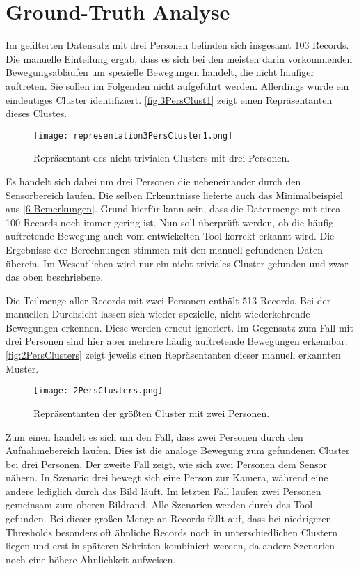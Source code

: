 \section{Ground-Truth Analyse}
\label{6-GroundTruth}
Im gefilterten Datensatz mit drei Personen befinden sich insgesamt 103 Records.
Die manuelle Einteilung ergab,
dass es sich bei den meisten darin vorkommenden Bewegungsabläufen
um spezielle Bewegungen handelt, die nicht häufiger auftreten.
Sie sollen im Folgenden nicht aufgeführt werden.
Allerdings wurde ein eindeutiges Cluster identifiziert.
\autoref{fig:3PersClust1} zeigt einen Repräsentanten dieses Clustes.
\begin{figure}[ht]
    \begin{center}
    \texttt{[image: representation3PersCluster1.png]}
    \end{center}
    \caption{Repräsentant des nicht trivialen Clusters mit drei Personen.}
    \label{fig:3PersClust1}
\end{figure}
Es handelt sich dabei um drei Personen die nebeneinander durch den Sensorbereich laufen.
Die selben Erkenntnisse lieferte auch das Minimalbeispiel aus \autoref{6-Bemerkungen}.
Grund hierfür kann sein, dass die Datenmenge mit circa 100 Records noch immer gering ist.
Nun soll überprüft werden, ob die häufig auftretende Bewegung auch
vom entwickelten Tool korrekt erkannt wird.
Die Ergebnisse der Berechnungen stimmen mit den manuell gefundenen Daten überein.
Im Wesentlichen wird nur ein nicht-triviales Cluster gefunden
und zwar das oben beschriebene.

Die Teilmenge aller Records mit zwei Personen enthält 513 Records.
Bei der manuellen Durchsicht lassen sich wieder spezielle,
nicht wiederkehrende Bewegungen erkennen.
Diese werden erneut ignoriert.
Im Gegensatz zum Fall mit drei Personen sind hier aber mehrere häufig auftretende Bewegungen erkennbar.
\autoref{fig:2PersClusters} zeigt jeweils einen Repräsentanten dieser manuell erkannten Muster.
\begin{figure}[ht]
    \begin{center}
    \texttt{[image: 2PersClusters.png]}
    \end{center}
    \caption{Repräsentanten der größten Cluster mit zwei Personen.}
    \label{fig:2PersClusters}
\end{figure}
Zum einen handelt es sich um den Fall, dass zwei Personen durch den Aufnahmebereich laufen.
Dies ist die analoge Bewegung zum gefundenen Cluster bei drei Personen.
Der zweite Fall zeigt, wie sich zwei Personen dem Sensor nähern.
In Szenario drei bewegt sich eine Person zur Kamera,
während eine andere lediglich durch das Bild läuft.
Im letzten Fall laufen zwei Personen gemeinsam zum oberen Bildrand.
Alle Szenarien werden durch das Tool gefunden.
Bei dieser großen Menge an Records fällt auf,
dass bei niedrigeren Thresholds besonders oft ähnliche Records noch in unterschiedlichen Clustern liegen
und erst in späteren Schritten kombiniert werden,
da andere Szenarien noch eine höhere Ähnlichkeit aufweisen.


